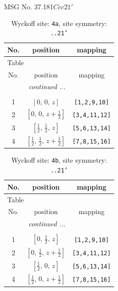 \documentclass[fleqn,8pt]{jsarticle}
\begin{document}
\setcounter{MaxMatrixCols}{32}

\renewcommand{\tablename}{Table~}
\renewcommand{\figurename}{Figure~}
\begin{center}
\LARGE
MSG No. 37.181\quad$Ccc21'$
\end{center}
\renewcommand{\arraystretch}{1.2}
\begin{longtable}{ccc}
\caption{Wyckoff site: {\tt 4a}, site symmetry: {\tt ..21'}}
 \\
 \hline \hline
No. & position & mapping \\ \hline \endfirsthead

\multicolumn{2}{l}{\tablename\ \thetable{}} \\
 \hline \hline
No. & position & mapping \\ \hline \endhead

 \hline \hline
\multicolumn{2}{r}{\footnotesize\it continued ...} \\ \endfoot

 \hline \hline
\multicolumn{2}{r}{} \\ \endlastfoot

1 & $\left[ 0,\, 0,\, z \right]$ & {\tt [1,2,9,10]} \\ \hline
2 & $\left[ 0,\, 0,\, z + \frac{1}{2} \right]$ & {\tt [3,4,11,12]} \\ \hline
3 & $\left[ \frac{1}{2},\, \frac{1}{2},\, z \right]$ & {\tt [5,6,13,14]} \\ \hline
4 & $\left[ \frac{1}{2},\, \frac{1}{2},\, z + \frac{1}{2} \right]$ & {\tt [7,8,15,16]} \\
\end{longtable}
\renewcommand{\arraystretch}{1.2}
\begin{longtable}{ccc}
\caption{Wyckoff site: {\tt 4b}, site symmetry: {\tt ..21'}}
 \\
 \hline \hline
No. & position & mapping \\ \hline \endfirsthead

\multicolumn{2}{l}{\tablename\ \thetable{}} \\
 \hline \hline
No. & position & mapping \\ \hline \endhead

 \hline \hline
\multicolumn{2}{r}{\footnotesize\it continued ...} \\ \endfoot

 \hline \hline
\multicolumn{2}{r}{} \\ \endlastfoot

1 & $\left[ 0,\, \frac{1}{2},\, z \right]$ & {\tt [1,2,9,10]} \\ \hline
2 & $\left[ 0,\, \frac{1}{2},\, z + \frac{1}{2} \right]$ & {\tt [3,4,11,12]} \\ \hline
3 & $\left[ \frac{1}{2},\, 0,\, z \right]$ & {\tt [5,6,13,14]} \\ \hline
4 & $\left[ \frac{1}{2},\, 0,\, z + \frac{1}{2} \right]$ & {\tt [7,8,15,16]} \\
\end{longtable}
\end{document}
